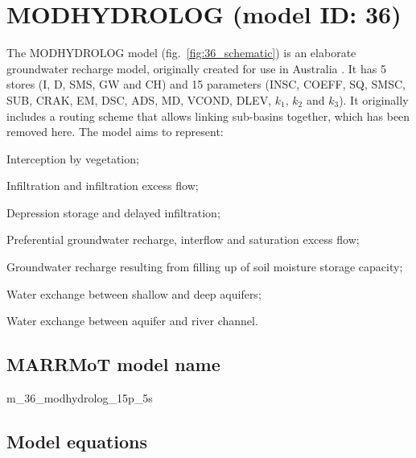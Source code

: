 \section{MODHYDROLOG (model ID: 36)}
The MODHYDROLOG model (fig.~\ref{fig:36_schematic}) is an elaborate groundwater recharge model, originally created for use in Australia \citep{Chiew1990,Chiew1994}. It has 5 stores (I, D, SMS, GW and CH) and 15 parameters (INSC, COEFF, SQ, SMSC, SUB, CRAK, EM, DSC, ADS, MD, VCOND, DLEV, $k_1$, $k_2$ and $k_3$). It originally includes a routing scheme that allows linking sub-basins together, which has been removed here. The model aims to represent:

\begin{itemizecompact}
\item Interception by vegetation;
\item Infiltration and infiltration excess flow;
\item Depression storage and delayed infiltration;
\item Preferential groundwater recharge, interflow and saturation excess flow;
\item Groundwater recharge resulting from filling up of soil moisture storage capacity;
\item Water exchange between shallow and deep aquifers;
\item Water exchange between aquifer and river channel.
\end{itemizecompact}

\subsection{MARRMoT model name}
m\_36\_modhydrolog\_15p\_5s \\

\subsection{Model equations}

